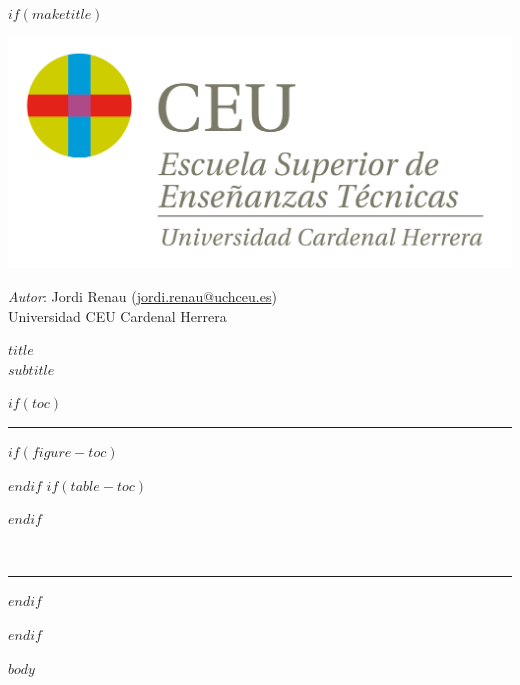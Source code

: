\documentclass[11pt,a4paper,twoside,onecolumn,notitlepage,final]{scrartcl}
\date{$date$}
\newcommand{\mititulo}{ $title$ }
\newcommand{\misubtitulo}{ $subtitle$ }
\begin{document}
	\renewcommand{\tablename}{Tabla}
	
	$if(maketitle)$
	\begin{titlepage}
		
		\begin{minipage}[c]{0.29\textwidth}
	\includegraphics[width=\linewidth]{00_fac_eset.png}%
	\end{minipage}
	\begin{minipage}[r]{0.7\textwidth}
		\begin{flushright}
			\large
			\textit{Autor}: Jordi Renau (\href{mailto:jordi.renau@uchceu.es}{jordi.renau@uchceu.es}) \\
			Universidad CEU Cardenal Herrera %
		\end{flushright}
		
	\end{minipage}
	
	\begin{flushright}
		\Huge 
		\mititulo \\[0.5cm]
		\huge
		\misubtitulo \\[1.5cm]
	\end{flushright}
	$if(toc)$
	\hrule
	\renewcommand{\contentsname}{Contenidos \small (\textit{Actualizado}: \today)}
	
	\tableofcontents 
	$if(figure-toc)$
	\renewcommand{\listfigurename}{Lista de figuras}
	\listoffigures
	$endif$
	$if(table-toc)$
	\renewcommand{\listtablename}{Lista de tablas}
	\listoftables
	$endif$
	
	~
	
	\hrule
	$endif$
\end{titlepage}
$endif$


$body$
\end{document}
